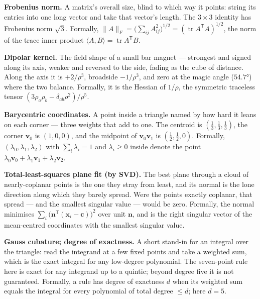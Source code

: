 \documentclass[11pt]{article}
\begin{document}
\textbf{Frobenius norm.} A matrix's overall size, blind to which way it points: string
its entries into one long vector and take that vector's length. The \(3\times3\) identity
has Frobenius norm \(\sqrt3\). Formally,
\(\|A\|_F = \big(\sum_{ij}A_{ij}^2\big)^{1/2} = (\operatorname{tr}A^{\mathsf T}A)^{1/2}\),
the norm of the trace inner product \(\langle A,B\rangle = \operatorname{tr}A^{\mathsf T}B\).

\textbf{Dipolar kernel.} The field shape of a small bar magnet --- strongest and signed
along its axis, weaker and reversed to the side, fading as the cube of distance. Along
the axis it is \(+2/\rho^3\), broadside \(-1/\rho^3\), and zero at the magic angle
(\(\ang{54.7}\)) where the two balance. Formally, it is the Hessian of \(1/\rho\), the
symmetric traceless tensor \((3\rho_a\rho_b - \delta_{ab}\rho^2)/\rho^5\).

\textbf{Barycentric coordinates.} A point inside a triangle named by how hard it leans on
each corner --- three weights that add to one. The centroid is
\((\tfrac13,\tfrac13,\tfrac13)\), the corner \(\bm v_0\) is \((1,0,0)\), and the midpoint
of \(\bm v_0\bm v_1\) is \((\tfrac12,\tfrac12,0)\). Formally,
\((\lambda_0,\lambda_1,\lambda_2)\) with \(\sum_i\lambda_i = 1\) and \(\lambda_i\ge 0\)
inside denote the point \(\lambda_0\bm v_0 + \lambda_1\bm v_1 + \lambda_2\bm v_2\).

\textbf{Total-least-squares plane fit (by SVD).} The best plane through a cloud of
nearly-coplanar points is the one they stray from least, and its normal is the lone
direction along which they barely spread. Were the points exactly coplanar, that spread
--- and the smallest singular value --- would be zero. Formally, the normal minimises
\(\sum_i\big(\bm n^{\mathsf T}(\bm x_i-\bm c)\big)^2\) over unit \(\bm n\), and is the
right singular vector of the mean-centred coordinates with the smallest singular value.

\textbf{Gauss cubature; degree of exactness.} A short stand-in for an integral over the
triangle: read the integrand at a few fixed points and take a weighted sum, which is the
exact integral for any low-degree polynomial. The seven-point rule here is exact for any
integrand up to a quintic; beyond degree five it is not guaranteed. Formally, a rule has
degree of exactness \(d\) when its weighted sum equals the integral for every polynomial
of total degree \(\le d\); here \(d = 5\).
\end{document}
